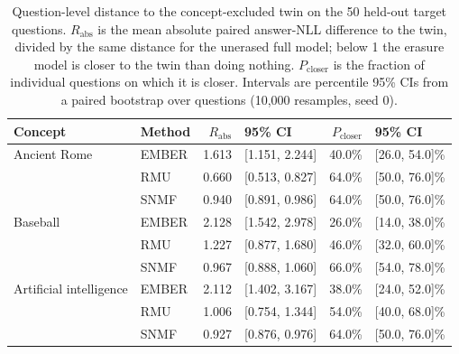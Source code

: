 
\begin{table}[t]
\centering
\small
\begin{tabular}{llrlrl}
\toprule
Concept & Method & $R_{\mathrm{abs}}$ & 95\% CI & $P_{\mathrm{closer}}$ & 95\% CI \\
\midrule
Ancient Rome & EMBER & 1.613 & [1.151, 2.244] & 40.0\% & [26.0, 54.0]\% \\
 & RMU & 0.660 & [0.513, 0.827] & 64.0\% & [50.0, 76.0]\% \\
 & SNMF & 0.940 & [0.891, 0.986] & 64.0\% & [50.0, 76.0]\% \\
\midrule
Baseball & EMBER & 2.128 & [1.542, 2.978] & 26.0\% & [14.0, 38.0]\% \\
 & RMU & 1.227 & [0.877, 1.680] & 46.0\% & [32.0, 60.0]\% \\
 & SNMF & 0.967 & [0.888, 1.060] & 66.0\% & [54.0, 78.0]\% \\
\midrule
Artificial intelligence & EMBER & 2.112 & [1.402, 3.167] & 38.0\% & [24.0, 52.0]\% \\
 & RMU & 1.006 & [0.754, 1.344] & 54.0\% & [40.0, 68.0]\% \\
 & SNMF & 0.927 & [0.876, 0.976] & 64.0\% & [50.0, 76.0]\% \\
\bottomrule
\end{tabular}
\caption{Question-level distance to the concept-excluded twin on the 50 held-out target questions. $R_{\mathrm{abs}}$ is the mean absolute paired answer-NLL difference to the twin, divided by the same distance for the unerased full model; below 1 the erasure model is closer to the twin than doing nothing. $P_{\mathrm{closer}}$ is the fraction of individual questions on which it is closer. Intervals are percentile 95\% CIs from a paired bootstrap over questions (10{,}000 resamples, seed 0).}
\label{tab:question-level-similarity}
\end{table}
